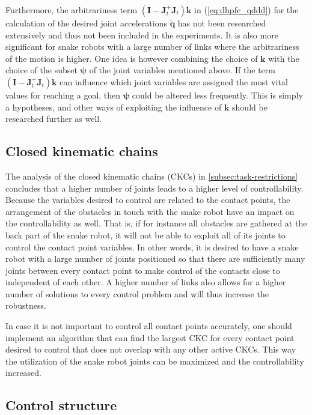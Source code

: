 Furthermore, the arbitrariness term $(\mathbf{I}-  \mathbf{J}_t^+ \mathbf{J}_t)\mathbf{k}$ in (\ref{eq:dhpfc_qddd}) for the calculation of the desired joint accelerations $\ddot{\mathbf{q}}$ has not been researched extensively and thus not been included in the experiments. It is also more significant for snake robots with a large number of links where the arbitrariness of the motion is higher. One idea is however combining the choice of $\mathbf{k}$ with the choice of the subset $\boldsymbol{\psi}$ of the joint variables mentioned above. If the term $(\mathbf{I}-  \mathbf{J}_t^+ \mathbf{J}_t)\mathbf{k}$ can influence which joint variables are assigned the most vital values for reaching a goal, then $\boldsymbol{\psi}$ could be altered less frequently. This is simply a hypotheses, and other ways of exploiting the influence of $\mathbf{k}$ should be researched further as well.

\subsection{Closed kinematic chains}

The analysis of the closed kinematic chains (CKCs) in \ref{subsec:task-restrictions} concludes that a higher number of joints leads to a higher level of controllability. Because the variables desired to control are related to the contact points, the arrangement of the obstacles in touch with the snake robot have an impact on the controllability as well. That is, if for instance all obstacles are gathered at the back part of the snake robot, it will not be able to exploit all of its joints to control the contact point variables. In other words, it is desired to have a snake robot with a large number of joints positioned so that there are sufficiently many joints between every contact point to make control of the contacts close to independent of each other. A higher number of links also allows for a higher number of solutions to every control problem and will thus increase the robustness.

In case it is not important to control all contact points accurately, one should implement an algorithm that can find the largest CKC for every contact point desired to control that does not overlap with any other active CKCs. This way the utilization of the snake robot joints can be maximized and the controllability increased.

\subsection{Control structure}

